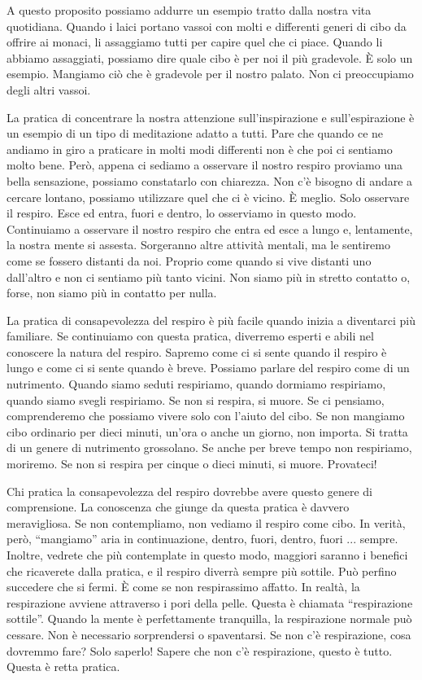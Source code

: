 A questo proposito possiamo addurre un esempio tratto dalla nostra vita
quotidiana. Quando i laici portano vassoi con molti e differenti generi
di cibo da offrire ai monaci, li assaggiamo tutti per capire quel che ci
piace. Quando li abbiamo assaggiati, possiamo dire quale cibo è per noi
il più gradevole. È solo un esempio. Mangiamo ciò che è gradevole per il
nostro palato. Non ci preoccupiamo degli altri vassoi.

La pratica di concentrare la nostra attenzione sull'inspirazione e
sull'espirazione è un esempio di un tipo di meditazione adatto a tutti.
Pare che quando ce ne andiamo in giro a praticare in molti modi
differenti non è che poi ci sentiamo molto bene. Però, appena ci sediamo
a osservare il nostro respiro proviamo una bella sensazione, possiamo
constatarlo con chiarezza. Non c'è bisogno di andare a cercare lontano,
possiamo utilizzare quel che ci è vicino. È meglio. Solo osservare il
respiro. Esce ed entra, fuori e dentro, lo osserviamo in questo modo.
Continuiamo a osservare il nostro respiro che entra ed esce a lungo e,
lentamente, la nostra mente si assesta. Sorgeranno altre attività
mentali, ma le sentiremo come se fossero distanti da noi. Proprio come
quando si vive distanti uno dall'altro e non ci sentiamo più tanto
vicini. Non siamo più in stretto contatto o, forse, non siamo più in
contatto per nulla.

La pratica di consapevolezza del respiro è più facile quando inizia a
diventarci più familiare. Se continuiamo con questa pratica, diverremo
esperti e abili nel conoscere la natura del respiro. Sapremo come ci si
sente quando il respiro è lungo e come ci si sente quando è breve.
Possiamo parlare del respiro come di un nutrimento. Quando siamo seduti
respiriamo, quando dormiamo respiriamo, quando siamo svegli respiriamo.
Se non si respira, si muore. Se ci pensiamo, comprenderemo che possiamo
vivere solo con l'aiuto del cibo. Se non mangiamo cibo ordinario per
dieci minuti, un'ora o anche un giorno, non importa. Si tratta di un
genere di nutrimento grossolano. Se anche per breve tempo non
respiriamo, moriremo. Se non si respira per cinque o dieci minuti, si
muore. Provateci!

Chi pratica la consapevolezza del respiro dovrebbe avere questo genere
di comprensione. La conoscenza che giunge da questa pratica è davvero
meravigliosa. Se non contempliamo, non vediamo il respiro come cibo. In
verità, però, ``mangiamo'' aria in continuazione, dentro, fuori, dentro,
fuori ... sempre. Inoltre, vedrete che più contemplate in questo modo,
maggiori saranno i benefici che ricaverete dalla pratica, e il respiro
diverrà sempre più sottile. Può perfino succedere che si fermi. È come
se non respirassimo affatto. In realtà, la respirazione avviene
attraverso i pori della pelle. Questa è chiamata ``respirazione
sottile''. Quando la mente è perfettamente tranquilla, la respirazione
normale può cessare. Non è necessario sorprendersi o spaventarsi. Se non
c'è respirazione, cosa dovremmo fare? Solo saperlo! Sapere che non c'è
respirazione, questo è tutto. Questa è retta pratica.

